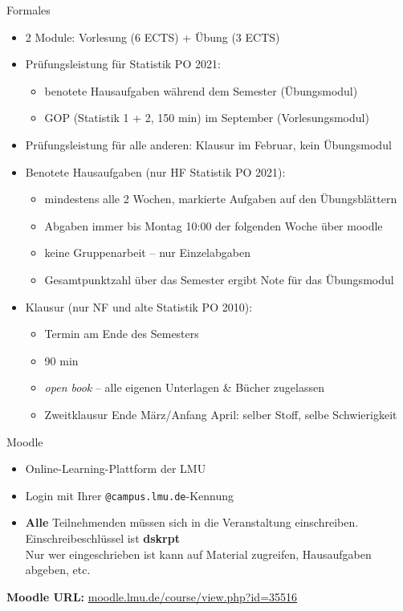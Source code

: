 \documentclass[
  10pt,
  ignorenonframetext,
]{beamer}
\providecommand{\tightlist}{%
  \setlength{\itemsep}{0pt}\setlength{\parskip}{0pt}}
\begin{document}
\begin{frame}{Formales}
\label{formales}
\begin{itemize}
\item
  2 Module: Vorlesung (6 ECTS) + Übung (3 ECTS)
\item
  Prüfungsleistung für Statistik PO 2021:

  \begin{itemize}
  \tightlist
  \item
    benotete Hausaufgaben während dem Semester (Übungsmodul)
  \item
    GOP (Statistik 1 + 2, 150 min) im September (Vorlesungsmodul)
  \end{itemize}
\item
  Prüfungsleistung für alle anderen: Klausur im Februar, kein
  Übungsmodul
\item
  Benotete Hausaufgaben (nur HF Statistik PO 2021):

  \begin{itemize}
  \tightlist
  \item
    mindestens alle 2 Wochen, markierte Aufgaben auf den Übungsblättern
  \item
    Abgaben immer bis Montag 10:00 der folgenden Woche über moodle
  \item
    keine Gruppenarbeit -- nur Einzelabgaben
  \item
    Gesamtpunktzahl über das Semester ergibt Note für das Übungsmodul
  \end{itemize}
\item
  Klausur (nur NF und alte Statistik PO 2010):

  \begin{itemize}
  \tightlist
  \item
    Termin am Ende des Semesters
  \item
    90 min
  \item
    \emph{open book} -- alle eigenen Unterlagen \& Bücher zugelassen
  \item
    Zweitklausur Ende März/Anfang April: selber Stoff, selbe
    Schwierigkeit
  \end{itemize}
\end{itemize}
\end{frame}

\begin{frame}[fragile]{Moodle}
\label{moodle}
\begin{itemize}
\tightlist
\item
  Online-Learning-Plattform der LMU
\item
  Login mit Ihrer \texttt{@campus.lmu.de}-Kennung
\item
  \textbf{Alle} Teilnehmenden müssen sich in die Veranstaltung
  einschreiben.\\
  Einschreibeschlüssel ist \textbf{dskrpt}\\
  Nur wer eingeschrieben ist kann auf Material zugreifen, Hausaufgaben
  abgeben, etc.
\end{itemize}

\textbf{Moodle URL:}
\href{https://moodle.lmu.de/course/view.php?id=35516}{moodle.lmu.de/course/view.php?id=35516}
\end{frame}
\end{document}
